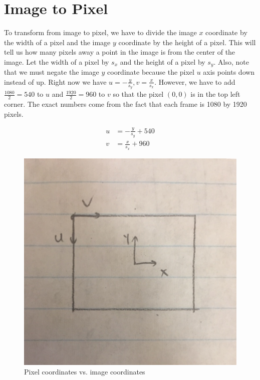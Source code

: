 \documentclass{article}
\begin{document}
\section{Image to Pixel}
To transform from image to pixel, we have to divide the image $x$ coordinate by the width of a pixel and the image $y$ coordinate by the height of a pixel. This will tell us how many pixels away a point in the image is from the center of the image. Let the width of a pixel by $s_{x}$ and the height of a pixel by $s_{y}$. Also, note that we must negate the image $y$ coordinate because the pixel $u$ axis points down instead of up. Right now we have $u=-\frac{y}{s_y}, v=\frac{x}{s_x}$. However, we have to add $\frac{1080}{2}=540$ to $u$ and $\frac{1920}{2}=960$ to $v$ so that the pixel $(0,0)$ is in the top left corner. The exact numbers come from the fact that each frame is 1080 by 1920 pixels.

\begin{align*}
u&=-\frac{y}{s_{y}}+540 \\
v&=\frac{x}{s_{x}}+960
\end{align*}

\begin{figure}[H]
\includegraphics[scale=0.3]{Pixel_Coordinates}
\centering
\caption{Pixel coordinates vs. image coordinates}
\end{figure}
\end{document}
